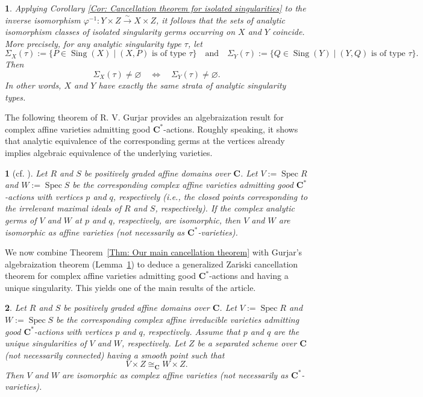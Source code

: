 \documentclass[10pt,a4paper]{amsart}
\numberwithin{equation}{section}
\numberwithin{figure}{section}
\newtheorem{thm}{\protect\theoremname}
\newtheorem{lem}[thm]{\protect\lemmaname}
\newtheorem{rem}{\protect\remarkname}
\providecommand{\lemmaname}{Lemma}
\providecommand{\theoremname}{Theorem}
\providecommand{\remarkname}{Remark}
\numberwithin{equation}{section}
\newcommand{\C}{\mathbf{C}}
\newcommand{\Spec}{\operatorname{Spec}}
\newcommand{\Sing}{\operatorname{Sing}}
\begin{document}
\begin{rem}
Applying Corollary \ref{Cor: Cancellation theorem for isolated singularities} to the inverse isomorphism $\varphi^{-1}: Y\times Z \xrightarrow{\sim} X\times Z$, it follows that the sets of analytic isomorphism classes of isolated singularity germs occurring on $X$ and $Y$ coincide. More precisely, for any analytic singularity type $\tau$, let
\[
\Sigma_X(\tau):=\{P\in \Sing(X)\mid (X,P)\text{ is of type }\tau\}
\quad \text{and} \quad
\Sigma_Y(\tau):=\{Q\in \Sing(Y)\mid (Y,Q)\text{ is of type }\tau\}.
\]
Then
\[
\Sigma_X(\tau)\neq \varnothing
\quad\iff\quad
\Sigma_Y(\tau)\neq \varnothing.
\]
In other words, $X$ and $Y$ have exactly the same strata of analytic singularity types.
\end{rem}

The following theorem of R. V. Gurjar provides an algebraization result for complex affine varieties admitting good $\C^*$-actions. Roughly speaking, it shows that analytic equivalence of the corresponding germs at the vertices already implies algebraic equivalence of the underlying varieties.


\begin{lem}[{cf. \cite[Theorem 2]{Gur2020}}]\label{Lem: Gurjar's result}
Let $R$ and $S$ be positively graded affine domains over $\C$. Let $V:=\Spec R$ and $W:=\Spec S$ be the corresponding complex affine varieties admitting good $\C^*$-actions with vertices $p$ and $q$, respectively (i.e., the closed points corresponding to the irrelevant maximal ideals of $R$ and $S$, respectively). If the complex analytic germs of $V$ and $W$ at $p$ and $q$, respectively, are isomorphic, then $V$ and $W$ are isomorphic as affine varieties (not necessarily as $\C^*$-varieties).
\end{lem}

We now combine Theorem~\ref{Thm: Our main cancellation theorem} with Gurjar's algebraization theorem (Lemma~\ref{Lem: Gurjar's result}) to deduce a generalized Zariski cancellation theorem for complex affine varieties admitting good $\C^*$-actions and having a unique singularity. This yields one of the main results of the article.


\begin{thm}\label{Thm: Our main cancellation theorem for C*-varieties}
Let $R$ and $S$ be positively graded affine domains over $\C$. Let $V:=\Spec R$ and $W:=\Spec S$ be the corresponding complex affine irreducible varieties admitting good $\C^*$-actions with vertices $p$ and $q$, respectively. Assume that $p$ and $q$ are the unique singularities of $V$ and $W$, respectively. Let $Z$ be a separated scheme over $\C$ (not necessarily connected) having a smooth point such that
\[
V\times Z \cong_{\C} W\times Z.
\]
Then $V$ and $W$ are isomorphic as complex affine varieties (not necessarily as $\C^*$-varieties).
\end{thm}
\end{document}
